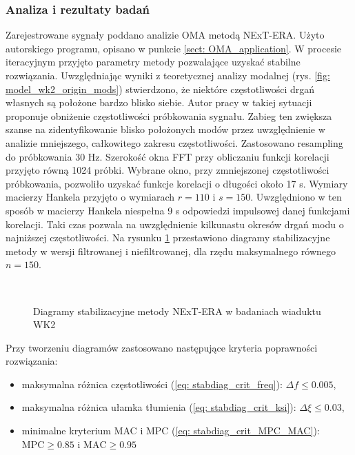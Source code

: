 \subsubsection{Analiza i rezultaty badań}
Zarejestrowane sygnały poddano analizie OMA metodą NExT-ERA. Użyto autorskiego programu, opisano w punkcie \ref{sect: OMA_application}. W procesie iteracyjnym przyjęto parametry metody pozwalające uzyskać stabilne rozwiązania. Uwzględniając wyniki z teoretycznej analizy modalnej (rys. \ref{fig: model_wk2_origin_mods}) stwierdzono, że niektóre częstotliwości drgań własnych są położone bardzo blisko siebie. Autor pracy \cite{Caicedo2011} w takiej sytuacji proponuje obniżenie częstotliwości próbkowania sygnału. Zabieg ten zwiększa szanse na zidentyfikowanie blisko położonych modów przez uwzględnienie w analizie mniejszego, całkowitego zakresu częstotliwości. Zastosowano resampling do próbkowania 30 Hz. Szerokość okna FFT przy obliczaniu funkcji korelacji przyjęto równą 1024 próbki. Wybrane okno, przy zmniejszonej częstotliwości próbkowania, pozwoliło uzyskać funkcje korelacji o długości około 17 s. Wymiary macierzy Hankela przyjęto o wymiarach $r=110$ i $s=150$. Uwzględniono w ten sposób w macierzy Hankela niespełna 9 s odpowiedzi impulsowej danej funkcjami korelacji. Taki czas pozwala na uwzględnienie kilkunastu okresów drgań modu o najniższej częstotliwości. Na rysunku \ref{fig: wk2_research_stabdiags} przestawiono diagramy stabilizacyjne metody w wersji filtrowanej i niefiltrowanej, dla rzędu maksymalnego równego $n=150$.

\begin{figure}[hbt!]
	\centering
	\\
	\captionsetup{justification=centering}
	\caption{Diagramy stabilizacyjne metody NExT-ERA w badaniach wiaduktu WK2}
	\label{fig: wk2_research_stabdiags}
\end{figure}
Przy tworzeniu diagramów zastosowano następujące kryteria poprawności rozwiązania:
\begin{itemize}
	\item maksymalna różnica częstotliwości (\ref{eq: stabdiag_crit_freq}): $\Delta f \le 0.005$,
	\item maksymalna różnica ułamka tłumienia (\ref{eq: stabdiag_crit_ksi}): $\Delta \xi \le 0.03$,
	\item minimalne kryterium MAC i MPC (\ref{eq: stabdiag_crit_MPC_MAC}): $\text{MPC}\ge 0.85$ i  $\text{MAC}\ge 0.95$
\end{itemize}

